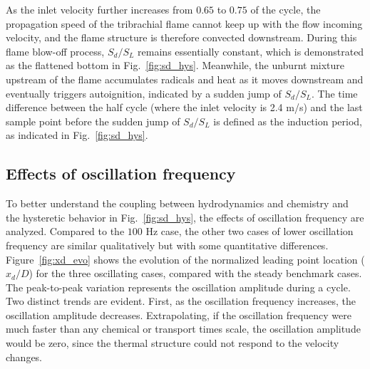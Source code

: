 \documentclass[review,3p,times]{elsarticle}
\begin{document}
\textcolor{Rev1}{As the inlet velocity further increases from $0.65$ to $0.75$ of the cycle, the propagation speed of the tribrachial flame cannot keep up with the flow incoming velocity, and the flame structure is therefore convected downstream.  During this flame blow-off process, $S_d/S_L$ remains essentially constant, which is demonstrated as the flattened bottom in Fig.~\ref{fig:sd_hys}.  Meanwhile, the unburnt mixture upstream of the flame accumulates radicals and heat as it moves downstream and eventually triggers autoignition, indicated by a sudden jump of $S_d/S_L$.  The time difference between the half cycle (where the inlet velocity is 2.4 m/s) and the last sample point before the sudden jump of $S_d/S_L$ is defined as the induction period, as indicated in Fig.~\ref{fig:sd_hys}.} 

\subsection{Effects of oscillation frequency} \label{sec:frq}

\textcolor{Rev1}{To better understand the coupling between hydrodynamics and chemistry and the hysteretic behavior in Fig.~\ref{fig:sd_hys}, the effects of oscillation frequency are analyzed.}  Compared to the $100$ Hz case, the other two cases of lower oscillation frequency are similar qualitatively but with some quantitative differences.  \textcolor{Rev1}{Figure~\ref{fig:xd_evo} shows the evolution of the normalized leading point location ($x_d/D$) for the three oscillating cases, compared with the steady benchmark cases.  The peak-to-peak variation represents the oscillation amplitude during a cycle.  Two distinct trends are evident.  First, as the oscillation frequency increases, the oscillation amplitude decreases.  Extrapolating, if the oscillation frequency were much faster than any chemical or transport times scale, the oscillation amplitude would be zero, since the thermal structure could not respond to the velocity changes.}  
\end{document}
